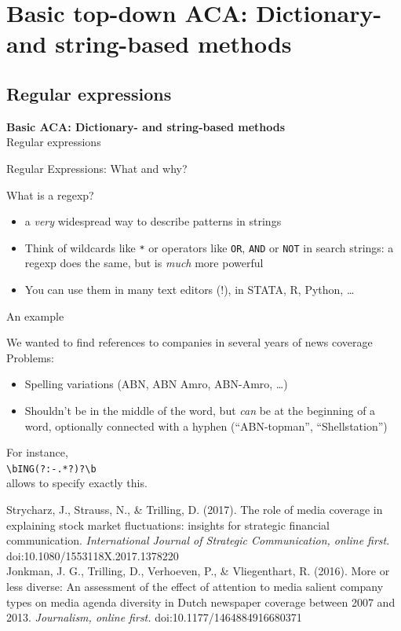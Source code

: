 \documentclass{beamer}
\begin{document}
\section[Basic ACA]{Basic top-down ACA: Dictionary- and string-based methods}

\subsection{Regular expressions}
\begin{frame}
	\textbf{Basic ACA: Dictionary- and string-based methods}\\
	Regular expressions
\end{frame}


\begin{frame}{Regular Expressions: What and why?}
\begin{block}{What is a regexp?}
\begin{itemize}
\item<1-> a \emph{very} widespread way to describe patterns in strings
\item<2-> Think of wildcards like {\tt{*}} or operators like {\tt{OR}}, {\tt{AND}} or {\tt{NOT}} in search strings: a regexp does the same, but is \emph{much} more powerful
\item<3-> You can use them in many text editors (!), in STATA, R, Python, \ldots 
\end{itemize}
\end{block}
\end{frame}

\begin{frame}{An example}
\begin{block}{We wanted to find references to companies in several years of news coverage}
Problems: 
\begin{itemize}
\item Spelling variations (ABN, ABN Amro, ABN-Amro, \ldots)
\item Shouldn't be in the middle of the word, but \emph{can} be at the beginning of a word, optionally connected with a hyphen (``ABN-topman'', ``Shellstation'')
\end{itemize}
For instance, \\
{\texttt{\textbackslash bING(?:-.*?)?\textbackslash b}} \\
allows to specify exactly this.
\end{block}
{\tiny{Strycharz, J., Strauss, N., \& Trilling, D. (2017). The role of media coverage in explaining stock market fluctuations: insights for strategic financial communication. \textit{International Journal of Strategic Communication, online first}. doi:10.1080/1553118X.2017.1378220 \\
Jonkman, J. G., Trilling, D., Verhoeven, P., \& Vliegenthart, R. (2016). More or less diverse: An assessment of the effect of attention to media salient company types on media agenda diversity in Dutch newspaper coverage between 2007 and 2013.\textit{ Journalism, online first.} doi:10.1177/1464884916680371\\ } }
\end{frame}
\end{document}
